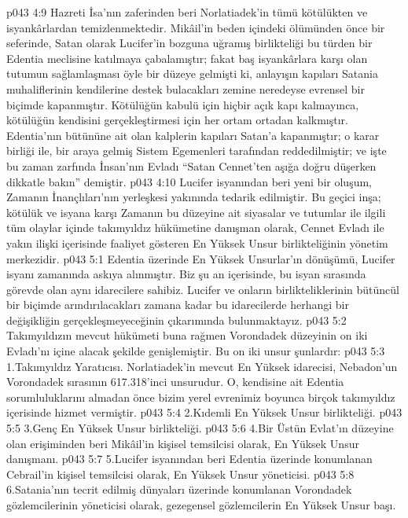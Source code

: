 \vs p043 4:9 Hazreti İsa’nın zaferinden beri Norlatiadek’in tümü kötülükten ve isyankârlardan temizlenmektedir. Mikâil’in beden içindeki ölümünden önce bir seferinde, Satan olarak Lucifer’in bozguna uğramış birlikteliği bu türden bir Edentia meclisine katılmaya çabalamıştır; fakat baş isyankârlara karşı olan tutumun sağlamlaşması öyle bir düzeye gelmişti ki, anlayışın kapıları Satania muhaliflerinin kendilerine destek bulacakları zemine neredeyse evrensel bir biçimde kapanmıştır. Kötülüğün kabulü için hiçbir açık kapı kalmayınca, kötülüğün kendisini gerçekleştirmesi için her ortam ortadan kalkmıştır. Edentia’nın bütününe ait olan kalplerin kapıları Satan’a kapanmıştır; o karar birliği ile, bir araya gelmiş Sistem Egemenleri tarafından reddedilmiştir; ve işte bu zaman zarfında İnsan’nın Evladı “Satan Cennet’ten aşığa doğru düşerken dikkatle bakın” demiştir.
\vs p043 4:10 Lucifer isyanından beri yeni bir oluşum, Zamanın İnançlıları’nın yerleşkesi yakınında tedarik edilmiştir. Bu geçici inşa; kötülük ve isyana karşı Zamanın bu düzeyine ait siyasalar ve tutumlar ile ilgili tüm olaylar içinde takımyıldız hükümetine danışman olarak, Cennet Evladı ile yakın ilişki içerisinde faaliyet gösteren En Yüksek Unsur birlikteliğinin yönetim merkezidir.
\vs p043 5:1 Edentia üzerinde En Yüksek Unsurlar’ın dönüşümü, Lucifer isyanı zamanında askıya alınmıştır. Biz şu an içerisinde, bu isyan sırasında görevde olan aynı idarecilere sahibiz. Lucifer ve onların birlikteliklerinin bütüncül bir biçimde arındırılacakları zamana kadar bu idarecilerde herhangi bir değişikliğin gerçekleşmeyeceğinin çıkarımında bulunmaktayız.
\vs p043 5:2 Takımyıldızın mevcut hükümeti buna rağmen Vorondadek düzeyinin on iki Evladı’nı içine alacak şekilde genişlemiştir. Bu on iki unsur şunlardır:
\vs p043 5:3 1.\bibnobreakspace Takımyıldız Yaratıcısı. Norlatiadek’in mevcut En Yüksek idarecisi, Nebadon’un Vorondadek sırasının 617.318’inci unsurudur. O, kendisine ait Edentia sorumluluklarını almadan önce bizim yerel evrenimiz boyunca birçok takımyıldız içerisinde hizmet vermiştir.
\vs p043 5:4 2.\bibnobreakspace Kıdemli En Yüksek Unsur birlikteliği.
\vs p043 5:5 3.\bibnobreakspace Genç En Yüksek Unsur birlikteliği.
\vs p043 5:6 4.\bibnobreakspace Bir Üstün Evlat’ın düzeyine olan erişiminden beri Mikâil’in kişisel temsilcisi olarak, En Yüksek Unsur danışmanı.
\vs p043 5:7 5.\bibnobreakspace Lucifer isyanından beri Edentia üzerinde konumlanan Cebrail’in kişisel temsilcisi olarak, En Yüksek Unsur yöneticisi.
\vs p043 5:8 6.\bibnobreakspace Satania’nın tecrit edilmiş dünyaları üzerinde konumlanan Vorondadek gözlemcilerinin yöneticisi olarak, gezegensel gözlemcilerin En Yüksek Unsur başı.
